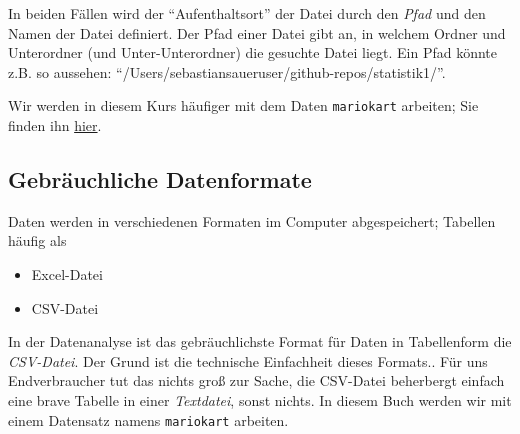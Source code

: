 \documentclass[
  letterpaper,
  twoside,
  open=any]{scrbook}
\providecommand{\tightlist}{%
  \setlength{\itemsep}{0pt}\setlength{\parskip}{0pt}}\usepackage{longtable,booktabs,array}
\theoremstyle{definition}
\theoremstyle{definition}
\theoremstyle{definition}
\theoremstyle{remark}
\begin{document}
In beiden Fällen wird der \enquote{Aufenthaltsort} der Datei durch den
\emph{Pfad} und den Namen der Datei definiert. Der Pfad einer Datei gibt
an, in welchem Ordner und Unterordner (und Unter-Unterordner) die
gesuchte Datei liegt. Ein Pfad könnte z.B. so aussehen:
\enquote{/Users/sebastiansaueruser/github-repos/statistik1/}.

\begin{tcolorbox}[enhanced jigsaw, colbacktitle=quarto-callout-note-color!10!white, colframe=quarto-callout-note-color-frame, coltitle=black, arc=.35mm, breakable, opacitybacktitle=0.6, toprule=.15mm, colback=white, rightrule=.15mm, opacityback=0, toptitle=1mm, title=\textcolor{quarto-callout-note-color}{\faInfo}\hspace{0.5em}{Hinweis}, titlerule=0mm, bottomtitle=1mm, bottomrule=.15mm, leftrule=.75mm, left=2mm]

Wir werden in diesem Kurs häufiger mit dem Daten \texttt{mariokart}
arbeiten; Sie finden ihn
\href{https://vincentarelbundock.github.io/Rdatasets/csv/openintro/mariokart.csv}{hier}.\footnotemark{}

\end{tcolorbox}


\subsection{Gebräuchliche
Datenformate}\label{gebruxe4uchliche-datenformate}

Daten werden in verschiedenen Formaten im Computer abgespeichert;
Tabellen häufig als

\begin{itemize}
\tightlist
\item
  Excel-Datei
\item
  CSV-Datei
\end{itemize}

In der Datenanalyse ist das gebräuchlichste Format für Daten in
Tabellenform die \emph{CSV-Datei}. Der Grund ist die technische
Einfachheit dieses Formats.. Für uns Endverbraucher tut das nichts groß
zur Sache, die CSV-Datei beherbergt einfach eine brave Tabelle in einer
\emph{Textdatei}, sonst nichts. In diesem Buch werden wir mit einem
Datensatz namens \texttt{mariokart} arbeiten.
\end{document}
